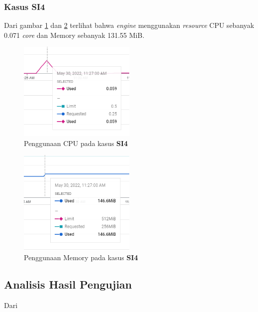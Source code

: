 \pagebreak

\subsubsection{Kasus SI4}
Dari gambar \ref{result_cpu_4} dan \ref{result_mem_4} terlihat bahwa \textit{engine} menggunakan \textit{resource} CPU sebanyak 0.071 \textit{core} dan Memory sebanyak 131.55 MiB. 

\begin{figure}[!htb]
	\centering
	\includegraphics[width=0.5\textwidth]{resources/ch4/resource/4-cpu.png}
	\caption{Penggunaan CPU pada kasus \textbf{SI4}}
	\label{result_cpu_4}
\end{figure}

\begin{figure}[!htb]
	\centering
	\includegraphics[width=0.5\textwidth]{resources/ch4/resource/4-mem.png}
	\caption{Penggunaan Memory pada kasus \textbf{SI4}}
	\label{result_mem_4}
\end{figure}

\pagebreak
\subsection{Analisis Hasil Pengujian}
Dari 
